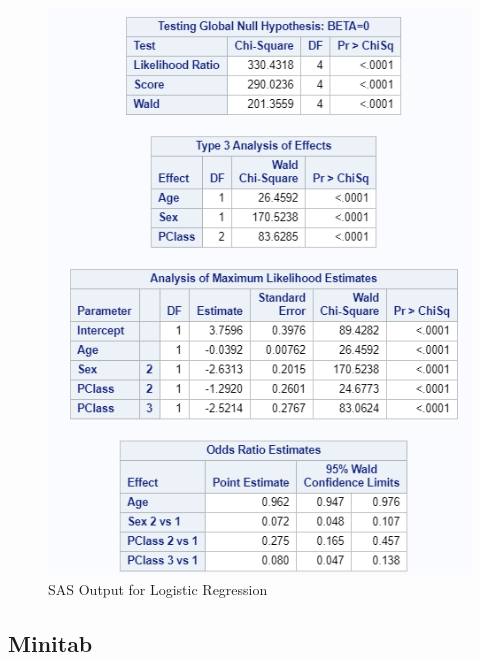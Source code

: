\documentclass[
]{book}
\begin{document}
\begin{figure}[!h]
\includegraphics{Screenshots/Logistic Regression/LogRegSAS} \caption{\label{fig:LogRegSAS}SAS Output for Logistic Regression}\label{fig:LogRegSAS}
\end{figure}

\hypertarget{minitab-2}{%
\subsection{Minitab}\label{minitab-2}}
\end{document}
